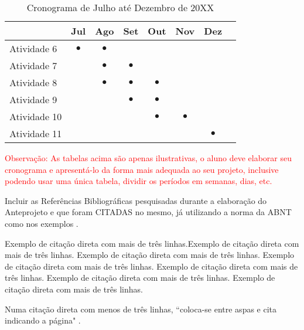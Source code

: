 \documentclass[font=plain]{abnt}
\begin{document}
\begin{table}[hb]
    \centering
    \begin{tabular}{ p{7.8cm} c c c c c c c }
        \toprule
         & Jul       & Ago       & Set       & Out       & Nov       & Dez       & \\
        \midrule
        Atividade 6
         & $\bullet$ & $\bullet$ &           &           &           &           & \\
        \midrule
        Atividade 7
         &           & $\bullet$ & $\bullet$ &           &           &           & \\
        \midrule
        Atividade 8
         &           & $\bullet$ & $\bullet$ & $\bullet$ &           &           & \\
        \midrule
        Atividade 9
         &           &           & $\bullet$ & $\bullet$ &           &           & \\
        \midrule
        Atividade 10
         &           &           &           & $\bullet$ & $\bullet$ &           & \\
        \midrule
        Atividade 11
         &           &           &           &           &           & $\bullet$ & \\
        \bottomrule
    \end{tabular}
    \caption{Cronograma de Julho até Dezembro de 20XX}
    \label{tab:cronograma-2-2}
\end{table}

\textcolor{red}{Observação: As tabelas acima são apenas ilustrativas, o aluno deve elaborar seu cronograma e apresentá-lo da forma mais adequada ao seu projeto, inclusive podendo usar uma única tabela, dividir os períodos em semanas, dias, etc.}

Incluir as Referências Bibliográficas pesquisadas durante a elaboração do Anteprojeto e que foram CITADAS no mesmo, já utilizando a norma da ABNT como nos exemplos\cite{exemplo1} \cite{exemplo2} \cite{exemplo3}.

\begin{citacao} Exemplo de citação direta com mais de três linhas.Exemplo de citação direta com mais de três linhas. Exemplo de citação direta com mais de três linhas. Exemplo de citação direta com mais de três linhas. Exemplo de citação direta com mais de três linhas. Exemplo de citação direta com mais de três linhas. Exemplo de citação direta com mais de três linhas\cite[p. 3]{exemplo1}.
\end{citacao}
Numa citação direta com menos de três linhas, ``coloca-se entre aspas e cita indicando a página" \cite[p. 2]{exemplo3}.



\end{document}
